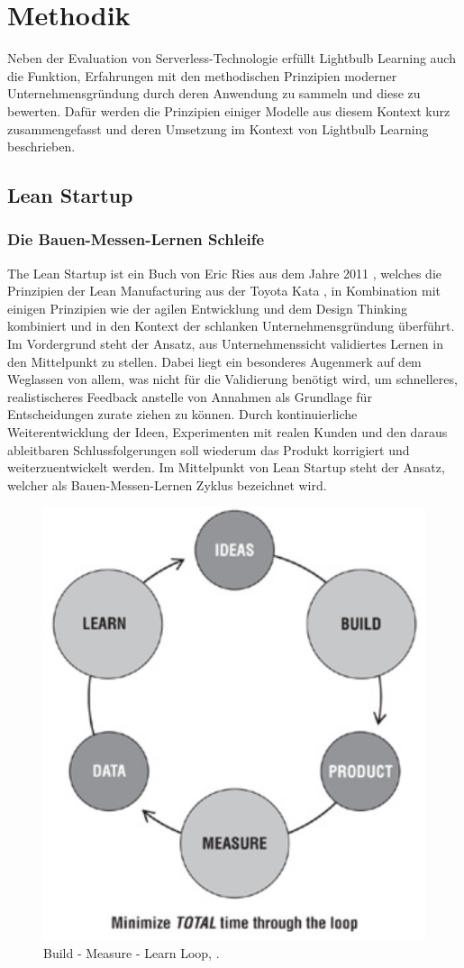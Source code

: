 \chapter{Methodik}
\label{chap:method}
Neben der Evaluation von Serverless-Technologie erfüllt Lightbulb Learning auch die Funktion, Erfahrungen mit den methodischen Prinzipien moderner Unternehmensgründung durch deren Anwendung zu sammeln und diese zu bewerten. Dafür werden die Prinzipien einiger Modelle aus diesem Kontext kurz zusammengefasst und deren Umsetzung im Kontext von Lightbulb Learning beschrieben.

\section{Lean Startup}
\label{sec:lean}
\subsection{Die Bauen-Messen-Lernen Schleife}
The Lean Startup ist ein Buch von Eric Ries aus dem Jahre 2011 \cite[vgl.][]{ries2011lean}, welches die Prinzipien der Lean Manufacturing aus der Toyota Kata \cite[vgl.][]{rother2009toyota}, in Kombination mit einigen Prinzipien wie der agilen Entwicklung und dem Design Thinking kombiniert und in den Kontext der schlanken Unternehmensgründung überführt. Im Vordergrund steht der Ansatz, aus Unternehmenssicht validiertes Lernen in den Mittelpunkt zu stellen. Dabei liegt ein besonderes Augenmerk auf dem Weglassen von allem, was nicht für die Validierung benötigt wird, um schnelleres, realistischeres Feedback anstelle von Annahmen als Grundlage für Entscheidungen zurate ziehen zu können. Durch kontinuierliche Weiterentwicklung der Ideen, Experimenten mit realen Kunden und den daraus ableitbaren Schlussfolgerungen soll wiederum das Produkt korrigiert und weiterzuentwickelt werden. Im Mittelpunkt von Lean Startup steht der Ansatz, welcher als Bauen-Messen-Lernen Zyklus \cite[S. 81]{ries2011lean} bezeichnet wird.

\begin{figure}[H]
    \centering
    \includegraphics[width = .5\textwidth]{images/lean.png}
    \caption{Build - Measure - Learn Loop, \cite[S. 81]{ries2011lean}.}
    \label{fig:bml}
\end{figure}

